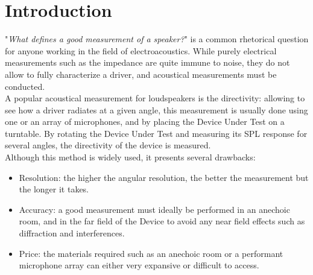 \documentclass{report}
\begin{document}

    



\chapter*{Introduction}


"\textit{What defines a good measurement of a speaker?}" is a common rhetorical question for anyone working in the field of electroacoustics. While purely electrical measurements such as the impedance are quite immune to noise, they do not allow to fully characterize a driver, and acoustical measurements must be conducted. \\
A popular acoustical measurement for loudspeakers is the directivity: allowing to see how a driver radiates at a given angle, this measurement is usually done using one or an array of microphones, and by placing the Device Under Test on a turntable. By rotating the Device Under Test and measuring its SPL response for several angles, the directivity of the device is measured. \\

Although this method is widely used, it presents several drawbacks:
\begin{itemize}
\item Resolution: the higher the angular resolution, the better the measurement but the longer it takes. 
\item Accuracy: a good measurement must ideally be performed in an anechoic room, and in the far field of the Device to avoid any near field effects such as diffraction and interferences.
\item Price: the materials required such as an anechoic room or a performant microphone array can either very expansive or difficult to access. 
\end{itemize}
\end{document}

